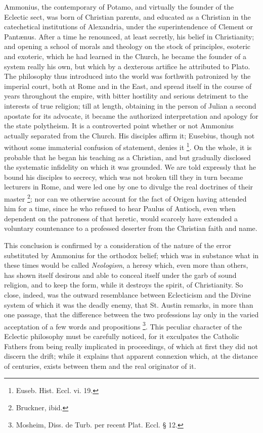Ammonius, the contemporary of Potamo, and virtually the founder of
the Eclectic sect, was born of Christian parents, and educated
as a Christian in the catechetical institutions of Alexandria, under
the superintendence of Clement or Pantænus. After a time he
renounced, at least secretly, his belief in Christianity; and opening
a school of morals and theology on the stock of principles, esoteric
and exoteric, which he had learned in the Church, he became the
founder of a system really his own, but which by a dexterous artifice
he attributed to Plato. The philosophy thus introduced into the world
was forthwith patronized by the imperial court, both at Rome and in
the East, and spread itself in the course of years throughout the
empire, with bitter hostility and serious detriment to the interests
of true religion; till at length, obtaining in the person of Julian a
second apostate for its advocate, it became the authorized
interpretation and apology for the state polytheism. It is a
controverted point whether or not Ammonius actually separated from the
Church. His disciples affirm it; Eusebius, though not without some
immaterial confusion of statement, denies it \footnote{Euseb. Hist. Eccl. vi. 19.}. On the whole, it is probable that he began his teaching as a
Christian, and but gradually disclosed the systematic infidelity on
which it was grounded. We are told expressly that he bound his
disciples to secrecy, which was not broken till they in turn became
lecturers in Rome, and were led one by one to divulge the real
doctrines of their master \footnote{Bruckner, ibid.};
nor can we otherwise account for the fact of Origen having attended
him for a time, since he who refused to hear Paulus of Antioch, even
when dependent on the patroness of that heretic, would scarcely
have extended a voluntary countenance to a professed deserter from the
Christian faith and name.

This conclusion is confirmed by a consideration of the nature of
the error substituted by Ammonius for the orthodox belief; which was
in substance what in these times would be called \emph{Neologism}, a
heresy which, even more than others, has shown itself desirous and
able to conceal itself under the garb of sound religion, and to keep
the form, while it destroys the spirit, of Christianity. So close,
indeed, was the outward resemblance between Eclecticism and the Divine
system of which it was the deadly enemy, that St. Austin remarks, in
more than one passage, that the difference between the two professions
lay only in the varied acceptation of a few words and propositions \footnote{Mosheim, Diss. de Turb. per recent Plat.
Eccl. § 12.}. This peculiar character of the Eclectic philosophy must be
carefully noticed, for it exculpates the Catholic Fathers from being
really implicated in proceedings, of which at first they did not
discern the drift; while it explains that apparent connexion which, at
the distance of centuries, exists between them and the real originator
of it.

